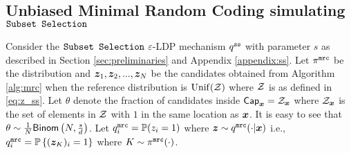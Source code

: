 \subsection{Unbiased Minimal Random Coding simulating \texorpdfstring{$\texttt{Subset Selection}$}{Subset Selection}}\label{appendix:debias_mrc_ss}
Consider the $\texttt{Subset Selection}$ $\varepsilon$-LDP mechanism $q^{\texttt{ss}}$ with parameter $s$ as described in Section \ref{sec:preliminaries} and Appendix \ref{appendix:ss}. 
Let $\pi^{\texttt{mrc}}$ be the distribution and ${\boldsymbol{z}}_1, {\boldsymbol{z}}_2,...,{\boldsymbol{z}}_N$ be the candidates obtained from Algorithm \ref{alg:mrc} when the reference distribution is $\mathrm{Unif}(\mathcal{Z})$ where $\mathcal{Z}$ is as defined in \eqref{eq:z_ss}.
Let $\theta$ denote the fraction of candidates inside $\mathsf{Cap}_{{\boldsymbol{x}}} = \mathcal{Z}_{{\boldsymbol{x}}}$ where $\mathcal{Z}_{{\boldsymbol{x}}}$ is the set of elements in $\mathcal{Z}$ with $1$ in the same location as ${\boldsymbol{x}}$. 
It is easy to see that $\theta \sim \frac{1}{N}\mathsf{Binom}\left( N, \frac{s}{d} \right)$.
Let $q^{\texttt{mrc}}_i = \mathbb{P}(z_i = 1)$ where ${\boldsymbol{z}} \sim q^{\texttt{mrc}}(\cdot|{\boldsymbol{x}})$ i.e., $q^{\texttt{mrc}}_i = \mathbb{P}\left\{({\boldsymbol{z}}_K)_i = 1\right\}$ where $K \sim \pi^{\texttt{mrc}}(\cdot)$. 

